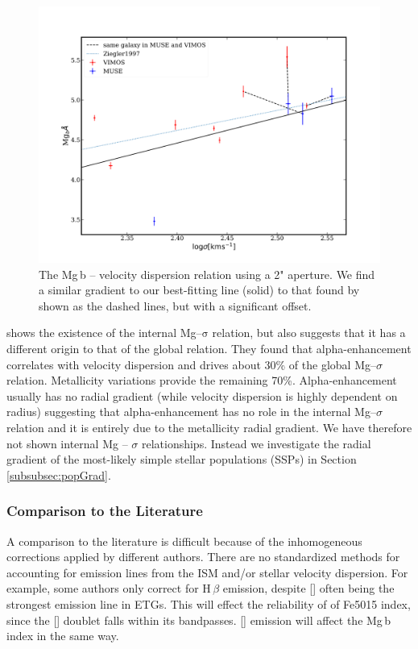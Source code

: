 			\begin{figure}
				\centering
				\includegraphics[width=.8\textwidth]{chapter4/Mg_sigma.png}
				\caption[Global Mg\,b--$\sigma$]{The Mg\,b -- velocity dispersion relation using a 2" aperture. We find a similar gradient to our best-fitting line (solid) to that found by \citet{Ziegler1997} shown as the dashed lines, but with a significant offset.}
				\label{fig:globalMg}
			\end{figure}

			\citet{Mehlert2003} shows the existence of the internal Mg--$\mathrm{\sigma}$ relation, but also suggests that it has a different origin to that of the global relation. They found that alpha-enhancement correlates with velocity dispersion and drives about 30\% of the global Mg--$\sigma$ relation. Metallicity variations provide the remaining 70\%. Alpha-enhancement usually has no radial gradient (while velocity dispersion is highly dependent on radius) suggesting that alpha-enhancement has no role in the internal Mg--$\sigma$ relation and it is entirely due to the metallicity radial gradient. We have therefore not shown internal Mg -- $\sigma$ relationships. Instead we investigate the radial gradient of the most-likely simple stellar populations (SSPs) in Section \ref{subsubsec:popGrad}.


		\subsubsection{Comparison to the Literature}
			\label{subsubsec:Lit}

			A comparison to the literature is difficult because of the inhomogeneous corrections applied by different authors. There are no standardized methods for accounting for emission lines from the ISM and/or stellar velocity dispersion. For example, some authors only correct for H\,$\beta$ emission, despite [] often being the strongest emission line in ETGs. This will effect the reliability of of Fe5015 index, since the [] doublet falls within its bandpasses. [] emission will affect the Mg\,b index in the same way. 

